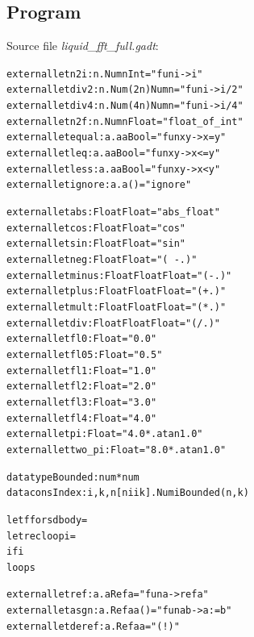 \documentclass{article}
\newcommand{\tmem}[1]{{\em #1\/}}
\newcommand{\tmverbatim}[1]{{\ttfamily{#1}}}
\newenvironment{tmcode}[1][]{\begin{alltt}}{\end{alltt}}
\begin{document}
\subsection{Program \tmverbatim{fft}}\label{FFTExample}

Source file {\tmem{liquid\_fft\_full.gadt}}:
\begin{tmcode}
external let n2i : n. Num n  Int = "fun i -> i"
external let div2 : n. Num (2 n)  Num n = "fun i -> i / 2"
external let div4 : n. Num (4 n)  Num n = "fun i -> i / 4"
external let n2f : n. Num n  Float = "float_of_int"
external let equal : a. a  a  Bool = "fun x y -> x = y"
external let leq : a. a  a  Bool = "fun x y -> x <= y"
external let less : a. a  a  Bool = "fun x y -> x < y"
external let ignore : a. a  () = "ignore"

external let abs : Float  Float = "abs_float"
external let cos : Float  Float = "cos"
external let sin : Float  Float = "sin"
external let neg : Float  Float = "(~-.)"
external let minus : Float  Float  Float = "(-.)"
external let plus : Float  Float  Float = "(+.)"
external let mult : Float  Float  Float = "( *. )"
external let div : Float  Float  Float = "( /. )"
external let fl0 : Float = "0.0"
external let fl05 : Float = "0.5"
external let fl1 : Float = "1.0"
external let fl2 : Float = "2.0"
external let fl3 : Float = "3.0"
external let fl4 : Float = "4.0"
external let pi : Float = "4.0 *. atan 1.0"
external let two_pi : Float = "8.0 *. atan 1.0"

datatype Bounded : num * num
datacons Index : i, k, n[n  i  i  k].Num i  Bounded (n, k)

let ffor s d body =
  let rec loop i =
    if i 
  loop s

external let ref : a. a  Ref a = "fun a -> ref a"
external let asgn : a. Ref a  a  () = "fun a b -> a := b"
external let deref : a. Ref a  a = "(!)"


\end{tmcode}
\end{document}
